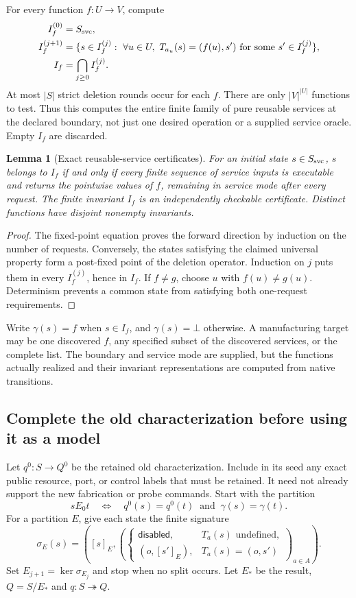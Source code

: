 \documentclass[11pt]{article}
\newtheorem{lemma}[theorem]{Lemma}
\theoremstyle{definition}
\theoremstyle{remark}
\begin{document}
For every function $f:U\to V$, compute
\begin{align*}
 I_f^{(0)}&=S_{\rm svc},\\
 I_f^{(j+1)}&=\{s\in I_f^{(j)}:\ \forall u\in U,\
       T_{a_u}(s)=(f(u),s')\text{ for some }s'\in I_f^{(j)}\},\\
 I_f&=\bigcap_{j\ge0}I_f^{(j)}.
\end{align*}
At most $|S|$ strict deletion rounds occur for each $f$. There are only
$|V|^{|U|}$ functions to test. Thus this computes the entire finite family of
pure reusable services at the declared boundary, not just one desired
operation or a supplied service oracle. Empty $I_f$ are discarded.

\begin{lemma}[Exact reusable-service certificates]\label{msc:lem:service}
For an initial state $s\in S_{\rm svc}$, $s$ belongs to $I_f$ if and only if every finite sequence of service
inputs is executable and returns the pointwise values of $f$, remaining in
service mode after every request. The finite invariant $I_f$ is an
independently checkable certificate. Distinct functions have disjoint
nonempty invariants.
\end{lemma}
\begin{proof}
The fixed-point equation proves the forward direction by induction on the
number of requests. Conversely, the states satisfying the claimed universal
property form a post-fixed point of the deletion operator. Induction on $j$
puts them in every $I_f^{(j)}$, hence in $I_f$. If $f\ne g$, choose $u$ with
$f(u)\ne g(u)$. Determinism prevents a common state from satisfying both
one-request requirements.
\end{proof}

Write $\gamma(s)=f$ when $s\in I_f$, and $\gamma(s)=\bot$ otherwise. A
manufacturing target may be one discovered $f$, any specified subset of the
discovered services, or the complete list. The boundary and service mode
are supplied, but the functions actually realized and their invariant
representations are computed from native transitions.

\subsection{Complete the old characterization before using it as a model}
Let $q^0:S\to Q^0$ be the retained old characterization. Include in its seed
any exact public resource, port, or control labels that must be retained.
It need not already support the new fabrication or probe commands. Start
with the partition
\[
 sE_0t\quad\Longleftrightarrow\quad
     q^0(s)=q^0(t)\ \text{ and }\ \gamma(s)=\gamma(t).
\]
For a partition $E$, give each state the finite signature
\[
 \sigma_E(s)=\left([s]_E,
   \left(\begin{cases}
      \mathsf{disabled},&T_a(s)\text{ undefined},\\
      (o,[s']_E),&T_a(s)=(o,s')
   \end{cases}\right)_{a\in A}\right).
\]
Set $E_{j+1}=\ker\sigma_{E_j}$ and stop when no split occurs. Let $E_*$ be
the result, $Q=S/E_*$ and $q:S\twoheadrightarrow Q$.
\end{document}
